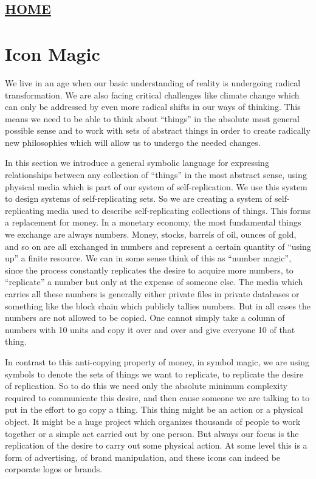 \hypertarget{home}{%
\subsection{\texorpdfstring{\href{scrolls/home}{HOME}}{HOME}}\label{home}}

\hypertarget{icon-magic}{%
\section{Icon Magic}\label{icon-magic}}

We live in an age when our basic understanding of reality is undergoing
radical transformation. We are also facing critical challenges like
climate change which can only be addressed by even more radical shifts
in our ways of thinking. This means we need to be able to think about
``things'' in the absolute most general possible sense and to work with
sets of abstract things in order to create radically new philosophies
which will allow us to undergo the needed changes.

In this section we introduce a general symbolic language for expressing
relationships between any collection of ``things'' in the most abstract
sense, using physical media which is part of our system of
self-replication. We use this system to design systems of
self-replicating sets. So we are creating a system of self-replicating
media used to describe self-replicating collections of things. This
forms a replacement for money. In a monetary economy, the most
fundamental things we exchange are always numbers. Money, stocks,
barrels of oil, ounces of gold, and so on are all exchanged in numbers
and represent a certain quantity of ``using up'' a finite resource. We
can in some sense think of this as ``number magic'', since the process
constantly replicates the desire to acquire more numbers, to
``replicate'' a number but only at the expense of someone else. The
media which carries all these numbers is generally either private files
in private databases or something like the block chain which publicly
tallies numbers. But in all cases the numbers are not allowed to be
copied. One cannot simply take a column of numbers with 10 units and
copy it over and over and give everyone 10 of that thing.

In contrast to this anti-copying property of money, in symbol magic, we
are using symbols to denote the sets of things we want to replicate, to
replicate the desire of replication. So to do this we need only the
absolute minimum complexity required to communicate this desire, and
then cause someone we are talking to to put in the effort to go copy a
thing. This thing might be an action or a physical object. It might be a
huge project which organizes thousands of people to work together or a
simple act carried out by one person. But always our focus is the
replication of the desire to carry out some physical action. At some
level this is a form of advertising, of brand manipulation, and these
icons can indeed be corporate logos or brands.

